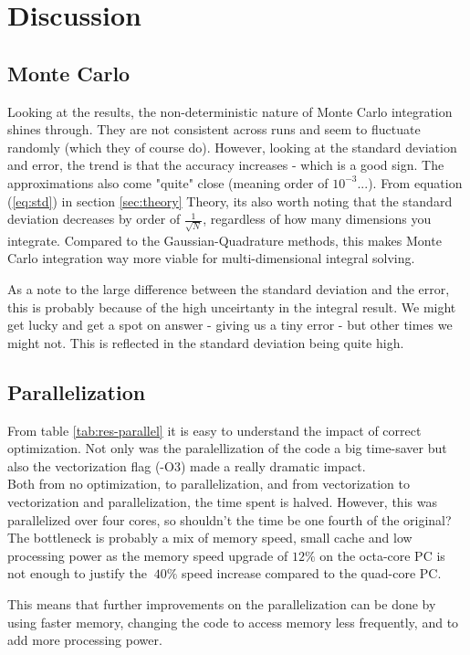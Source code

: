 \documentclass[../main.tex]{subfiles}
\begin{document}
\section{Discussion}
\subsection{Monte Carlo}
Looking at the results, the non-deterministic nature of Monte Carlo integration shines through. They are not consistent across runs and seem to fluctuate randomly (which they of course do). However, looking at the standard deviation and error, the trend is that the accuracy increases - which is a good sign. The approximations also come "quite" close (meaning order of $10^{-3}$...). From equation (\ref{eq:std}) in section \ref{sec:theory} Theory, its also worth noting that the standard deviation decreases by order of $\frac{1}{\sqrt{N}}$, regardless of how many dimensions you integrate. Compared to the Gaussian-Quadrature methods, this makes Monte Carlo integration way more viable for multi-dimensional integral solving.

As a note to the large difference between the standard deviation and the error, this is probably because of the high unceirtanty in the integral result. We might get lucky and get a spot on answer - giving us a tiny error - but other times we might not. This is reflected in the standard deviation being quite high.

\subsection{Parallelization}
From table \ref{tab:res-parallel} it is easy to understand the impact of correct optimization. Not only was the paralellization of the code a big time-saver but also the vectorization flag (-O3) made a really dramatic impact.\\

Both from no optimization, to parallelization, and from vectorization to vectorization and parallelization, the time spent is halved. However, this was parallelized over four cores, so shouldn't the time be one fourth of the original? The bottleneck is probably a mix of memory speed, small cache and low processing power as the memory speed upgrade of $12\%$ on the octa-core PC is not enough to justify the $~40\%$ speed increase compared to the quad-core PC.

This means that further improvements on the parallelization can be done by using faster memory, changing the code to access memory less frequently, and to add more processing power.
\end{document}
